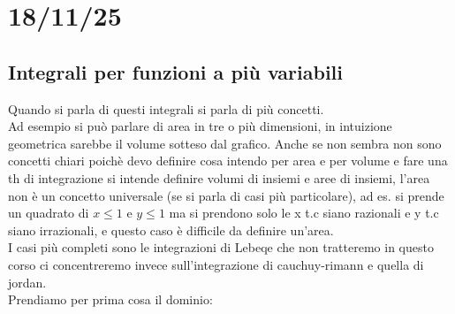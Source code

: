 \documentclass[a4paper, oneside]{article}
\begin{document}
\section{18/11/25}
\subsection{Integrali per funzioni a più variabili}
Quando si parla di questi integrali si parla di più concetti.\\
Ad esempio si può parlare di area in tre o più dimensioni, in intuizione geometrica sarebbe il volume sotteso dal grafico. Anche se non sembra non sono concetti chiari poichè devo definire cosa intendo per area e per volume e fare una th di integrazione si intende definire volumi di insiemi e aree di insiemi, l'area non è un concetto universale (se si parla di casi più particolare), ad es. si prende un quadrato di $x \leq 1$ e $y\leq 1$ ma si prendono solo le x t.c siano razionali e y t.c siano irrazionali, e questo caso è difficile da definire un'area.\\
I casi più  completi sono le integrazioni di Lebeqe che non tratteremo in questo corso ci concentreremo invece sull'integrazione di cauchuy-rimann e quella di jordan.\\
Prendiamo per prima cosa il dominio:
\tiny
\end{document}

